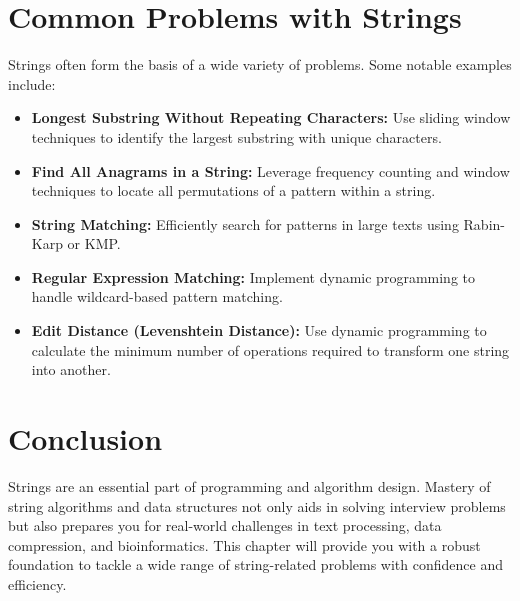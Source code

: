 \section*{Common Problems with Strings}
Strings often form the basis of a wide variety of problems. Some notable examples include:
\begin{itemize}
    \item \textbf{Longest Substring Without Repeating Characters:} Use sliding window techniques to identify the largest substring with unique characters.
    \item \textbf{Find All Anagrams in a String:} Leverage frequency counting and window techniques to locate all permutations of a pattern within a string.
    \item \textbf{String Matching:} Efficiently search for patterns in large texts using Rabin-Karp or KMP.
    \item \textbf{Regular Expression Matching:} Implement dynamic programming to handle wildcard-based pattern matching.
    \item \textbf{Edit Distance (Levenshtein Distance):} Use dynamic programming to calculate the minimum number of operations required to transform one string into another.
\end{itemize}

\section*{Conclusion}
Strings are an essential part of programming and algorithm design. Mastery of string algorithms and data structures not only aids in solving interview problems but also prepares you for real-world challenges in text processing, data compression, and bioinformatics. This chapter will provide you with a robust foundation to tackle a wide range of string-related problems with confidence and efficiency.